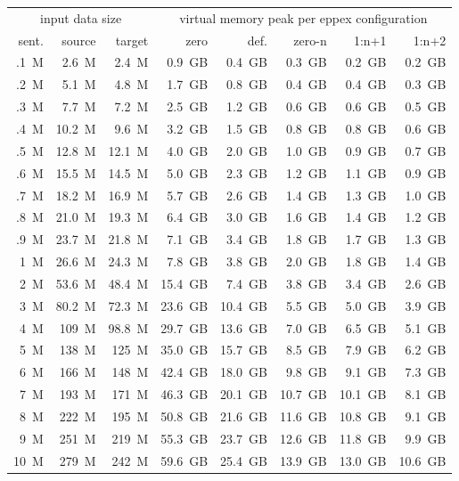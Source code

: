 \begin{table}[!htb]
\centering
\def\arraystretch{1.1}
\begin{tabular}{ | r  r  r | r  r  r  r  r | }
\hline
\multicolumn{3}{|c|}{input data size} & \multicolumn{5}{|c|}{virtual memory peak per eppex configuration} \\
sent. & source & target & zero & def. & zero-n & 1:n+1 & 1:n+2 \\
\hline
\hline
.1~M & 2.6~M & 2.4~M & 0.9~GB & 0.4~GB & 0.3~GB & 0.2~GB & 0.2~GB \\
.2~M & 5.1~M & 4.8~M & 1.7~GB & 0.8~GB & 0.4~GB & 0.4~GB & 0.3~GB \\
.3~M & 7.7~M & 7.2~M & 2.5~GB & 1.2~GB & 0.6~GB & 0.6~GB & 0.5~GB \\
.4~M & 10.2~M & 9.6~M & 3.2~GB & 1.5~GB & 0.8~GB & 0.8~GB & 0.6~GB \\
.5~M & 12.8~M & 12.1~M & 4.0~GB & 2.0~GB & 1.0~GB & 0.9~GB & 0.7~GB \\
.6~M & 15.5~M & 14.5~M & 5.0~GB & 2.3~GB & 1.2~GB & 1.1~GB & 0.9~GB \\
.7~M & 18.2~M & 16.9~M & 5.7~GB & 2.6~GB & 1.4~GB & 1.3~GB & 1.0~GB \\
.8~M & 21.0~M & 19.3~M & 6.4~GB & 3.0~GB & 1.6~GB & 1.4~GB & 1.2~GB \\
.9~M & 23.7~M & 21.8~M & 7.1~GB & 3.4~GB & 1.8~GB & 1.7~GB & 1.3~GB \\
1~M & 26.6~M & 24.3~M & 7.8~GB & 3.8~GB & 2.0~GB & 1.8~GB & 1.4~GB \\
2~M & 53.6~M & 48.4~M & 15.4~GB & 7.4~GB & 3.8~GB & 3.4~GB & 2.6~GB \\
3~M & 80.2~M & 72.3~M & 23.6~GB & 10.4~GB & 5.5~GB & 5.0~GB & 3.9~GB \\
4~M & 109~M & 98.8~M & 29.7~GB & 13.6~GB & 7.0~GB & 6.5~GB & 5.1~GB \\
5~M & 138~M & 125~M & 35.0~GB & 15.7~GB & 8.5~GB & 7.9~GB & 6.2~GB \\
6~M & 166~M & 148~M & 42.4~GB & 18.0~GB & 9.8~GB & 9.1~GB & 7.3~GB \\
7~M & 193~M & 171~M & 46.3~GB & 20.1~GB & 10.7~GB & 10.1~GB & 8.1~GB \\
8~M & 222~M & 195~M & 50.8~GB & 21.6~GB & 11.6~GB & 10.8~GB & 9.1~GB \\
9~M & 251~M & 219~M & 55.3~GB & 23.7~GB & 12.6~GB & 11.8~GB & 9.9~GB \\
10~M & 279~M & 242~M & 59.6~GB & 25.4~GB & 13.9~GB & 13.0~GB & 10.6~GB \\

\end{tabular}
\end{table}
